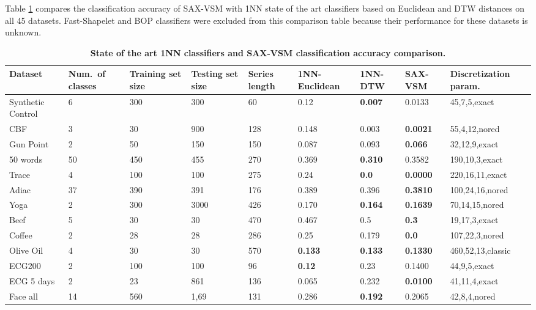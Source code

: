 Table \ref{perf_table2} compares the classification accuracy of SAX-VSM with 
1NN state of the art classifiers based on Euclidean and DTW distances on all 45 datasets. 
Fast-Shapelet and BOP classifiers were excluded from this comparison table because their 
performance for these datasets is unknown.

\clearpage

\begin{table}[t!]
\caption{\bf State of the art 1NN classifiers and SAX-VSM classification accuracy comparison.}
 \label{perf_table2}
\centering
{\setlength{\extrarowheight}{1pt}%
{\scriptsize
\begin{tabularx}{\linewidth}{@{} l *7X @{} l}
\hline
Dataset & \mbox{Num. of} classes & Training set size & Testing set size & Series length & 1NN-Euclidean & 1NN-DTW & SAX-VSM & Discretization param. \\
\hline
Synthetic Control & 6 & 300 & 300 & 60 & 0.12 & \textbf{0.007} & 0.0133 & 45,7,5,exact \\
CBF & 3 & 30 & 900 & 128 & 0.148 & 0.003 & \textbf{0.0021} & 55,4,12,nored \\
Gun Point & 2 & 50 & 150 & 150 & 0.087 & 0.093 & \textbf{0.066} & 32,12,9,exact \\
50 words & 50 & 450 & 455 & 270 & 0.369 & \textbf{0.310} & 0.3582 & 190,10,3,exact \\ 
Trace & 4 & 100 & 100 & 275 & 0.24 & \textbf{0.0} & \textbf{0.0000} & 220,16,11,exact \\
Adiac & 37 & 390 & 391 & 176 & 0.389 & 0.396 & \textbf{0.3810} & 100,24,16,nored \\
Yoga & 2 & 300 & 3000 & 426 & 0.170 & \textbf{0.164} & \textbf{0.1639} & 70,14,15,nored \\ 
Beef & 5 & 30 & 30 & 470 & 0.467 & 0.5 & \textbf{0.3} & 19,17,3,exact \\ 
Coffee & 2 & 28 & 28 & 286 & 0.25 & 0.179 & \textbf{0.0} & 107,22,3,nored \\
Olive Oil & 4 & 30 & 30 & 570 & \textbf{0.133} & \textbf{0.133} & \textbf{0.1330} & 460,52,13,classic \\
ECG200 & 2 & 100 & 100 & 96 & \textbf{0.12} & 0.23 & 0.1400 & 44,9,5,exact \\
ECG 5 days & 2 & 23 & 861 & 136 & 0.065 & 0.232 & \textbf{0.0100} & 41,11,4,exact \\
Face all & 14 & 560 & 1,69 & 131 & 0.286 & \textbf{0.192} & 0.2065 & 42,8,4,nored \\

\end{tabularx}}}
\end{table}
